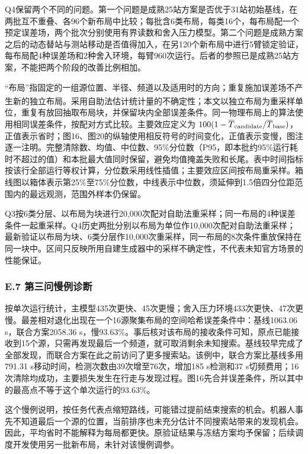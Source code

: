 \documentclass[UTF8,fontset=none,zihao=-4,a4paper]{ctexart}
\begin{document}
Q4保留两个不同的问题。第一个问题是成熟25站方案是否优于31站初始基线，在两批互不重叠、各96个新布局中比较；每批含6类布局，每类16个，每布局配一个预定误差场，两个批次分别使用有界读数和舍入压力模型。第二个问题是成熟方案之后的动态替站与测站移动是否值得加入，在另120个新布局中进行5臂锁定验证，每布局配4种误差场和2种舍入环境，每臂960次运行。后者的参照已是成熟25站方案，不能把两个阶段的改善比例相加。

``布局''指固定的一组源位置、半径、频道以及适用时的方向；重复施加误差场不产生新的独立布局。采用自助法估计统计量的不确定性\textsuperscript{\cite{efron1979}}；本文以独立布局为重采样单位，重复有放回抽取布局块，并保留块内全部误差条件。同一物理布局上的算法使用相同误差条件，按配对方式比较。主要效应定义为 \(100(1-\overline T_{\rm candidate}/\overline T_{\rm base})\)，正值表示省时；图16、图20的纵轴使用相反符号的时间变化，正值表示变慢，图注逐一注明。完整清除数、均值、中位数、95\%分位数（P95，即本批约95\%运行耗时不超过的值）和本批最大值同时保留，避免均值掩盖失败和长尾。表中时间指标按该行全部运行等权计算，分位数采用线性插值；主要效应区间按布局重采样。箱线图以箱体表示第25\%至75\%分位数，中线表示中位数，须延伸到1.5倍四分位距范围内的最远观测，范围外样本仍保留。

Q3按6类分层、以布局为块进行20,000次配对自助法重采样；同一布局的4种误差条件一起重采样。Q4历史两批分别以布局为单位作10,000次配对自助法重采样；最新验证以布局为块、6类分层作10,000次重采样，同一布局的8次条件重放保持在同一块中。区间只反映所用自建生成器中的采样不确定性，不代表未知官方场景的性能保证。

\subsubsection{E.7 第三问慢例诊断}\label{e.7-ux7b2cux4e09ux95eeux6162ux4f8bux8bcaux65ad}

按单次运行统计，主模型435次更快、45次更慢；舍入压力环境433次更快、47次更慢。最差相对退化出现在一个16源聚集布局的空间哈希误差条件中：基线1063.06 s，联合方案2058.36 s，慢93.63\%。事后核对该布局的接收条件可知，原点已能接收到15个源，只需再发现最后一个频道，就可取消剩余未知搜索。基线较早完成了全部发现，而联合方案在此之前访问了更多搜索站。该例中，联合方案比基线多用791.31 s移动时间，检测次数由39次增至76次，增加185 s检测和37 s切频费用；16次清除均成功，主要损失发生在行走与发现过程。图16先合并误差条件，所以其中的最高点不等于这个单次运行的93.63\%。

这个慢例说明，按任务代表点缩短路线，可能错过提前结束搜索的机会。机器人事先不知道最后一个源的位置，当前排序也未充分估计不同搜索站带来的发现机会。因此，平均省时不能解释为每局都更快。原验证结果与冻结方案均予保留；后续调度开发使用另一批新布局，未针对该慢例调参。
\end{document}
